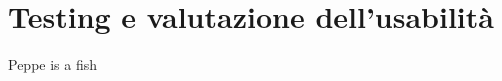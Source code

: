 \chapter{Testing e valutazione dell’usabilità}
\label{cha:Testing e valutazione dell’usabilità}
Peppe is a  fish


\lipsum[1-4]